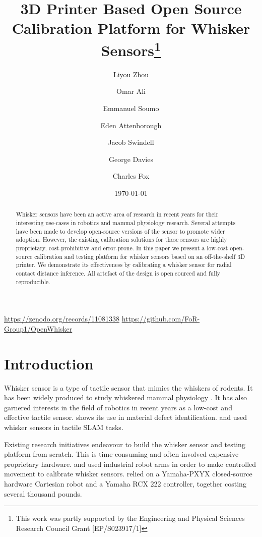 \documentclass[runningheads]{llncs}
\title{3D Printer Based Open Source Calibration Platform for Whisker Sensors\thanks{This work was partly supported by the Engineering and Physical Sciences
Research Council Grant [EP/S023917/1]}}
\author{
    Liyou Zhou\orcidID{0009-0005-9491-9003} \and
    Omar Ali \and
    Emmanuel Soumo \and
    Eden Attenborough \and
    Jacob Swindell \and
    George Davies \and
    Charles Fox
}
\institute{School of Computer Science, University of Lincoln, Lincoln, UK}
\date{\today}
\begin{document}
\maketitle

\vspace{-10pt}

\begin{center}
    \url{https://zenodo.org/records/11081338}
    \url{https://github.com/FoR-Group1/OpenWhisker}
\end{center}

\begin{abstract}
Whisker sensors have been an active area of research in recent years for their interesting use-cases in robotics and mammal physiology research. Several attempts have been made to develop open-source versions of the sensor to promote wider adoption. However, the existing calibration solutions for these sensors are highly proprietary, cost-prohibitive and error-prone. In this paper we present a low-cost open-source calibration and testing platform for whisker sensors based on an off-the-shelf 3D printer. We demonstrate its effectiveness by calibrating a whisker sensor for radial contact distance inference. All artefact of the design is open sourced and fully reproducible.
\end{abstract}

\section{Introduction}

Whisker sensor is a type of tactile sensor that mimics the whiskers of rodents. It has been widely produced to study whiskered mammal physiology \cite{prescottActiveTouchSensing2020}. It has also garnered interests in the field of robotics in recent years as a low-cost and effective tactile sensor. \cite{fotouhiDetectionBarelyVisible2021} shows its use in material defect identification. \cite{struckmeierViTaSLAMBioinspiredVisuoTactile2019} and \cite{foxTactileSLAMBiomimetic2012} used whisker sensors in tactile SLAM tasks.

Existing research initiatives endeavour to build the whisker sensor and testing platform from scratch. This is time-consuming and often involved expensive proprietary hardware. \cite{sullivanTactileDiscriminationUsing2012a} and \cite{fotouhiDetectionBarelyVisible2021} used industrial robot arms in order to make controlled movement to calibrate whisker sensors. \cite{evansWhiskerobjectContactSpeed2010a} relied on a Yamaha-PXYX closed-source hardware Cartesian robot and a Yamaha RCX 222 controller, together costing several thousand pounds.
\end{document}
